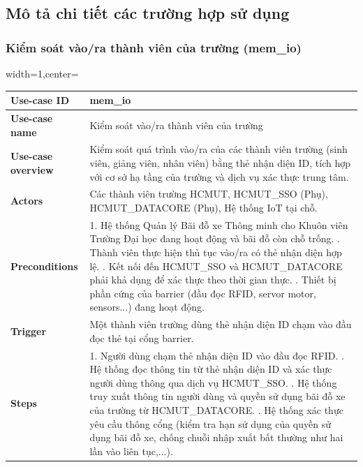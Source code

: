 \subsection{Mô tả chi tiết các trường hợp sử dụng}
\subsubsection{Kiểm soát vào/ra thành viên của trường (mem\_io)}
\begin{adjustbox}{width=1\textwidth,center=\textwidth}
\small
\begin{tabular}{|>{\centering\arraybackslash}m{3.5cm}|m{13.2cm}|}
\hline
\textbf{Use-case ID} & mem\_io \\ \hline
\textbf{Use-case name} & Kiểm soát vào/ra thành viên của trường \\ \hline
\textbf{Use-case overview} & Kiểm soát quá trình vào/ra của các thành viên trường (sinh viên, giảng viên, nhân viên) bằng thẻ nhận diện ID, tích hợp với cơ sở hạ tầng của trường và dịch vụ xác thực trung tâm. \\ \hline
\textbf{Actors} & Các thành viên trường HCMUT, HCMUT\_SSO (Phụ), HCMUT\_DATACORE (Phụ), Hệ thống IoT tại chỗ. \\ \hline
\textbf{Preconditions} & 
1. Hệ thống Quản lý Bãi đỗ xe Thông minh cho Khuôn viên Trường Đại học đang hoạt động và bãi đỗ còn chỗ trống. \newline
2. Thành viên thực hiện thủ tục vào/ra có thẻ nhận diện hợp lệ. \newline
3. Kết nối đến HCMUT\_SSO và HCMUT\_DATACORE phải khả dụng để xác thực theo thời gian thực. \newline
4. Thiết bị phần cứng của barrier (đầu đọc RFID, servor motor, sensors...) đang hoạt động. \\ \hline
\textbf{Trigger} & Một thành viên trường dùng thẻ nhận diện ID chạm vào đầu đọc thẻ tại cổng barrier. \\ \hline
\textbf{Steps} & 
1. Người dùng chạm thẻ nhận diện ID vào đầu đọc RFID. \newline
2. Hệ thống đọc thông tin từ thẻ nhận diện ID và xác thực người dùng thông qua dịch vụ HCMUT\_SSO. \newline
3. Hệ thống truy xuất thông tin người dùng và quyền sử dụng bãi đỗ xe của trường từ HCMUT\_DATACORE. \newline
4. Hệ thống xác thực yêu cầu thông cổng (kiểm tra hạn sử dụng của quyền sử dụng bãi đỗ xe, chống chuỗi nhập xuất bất thường như hai lần vào liên tục,...). \newline

\end{tabular}
\end{adjustbox}
